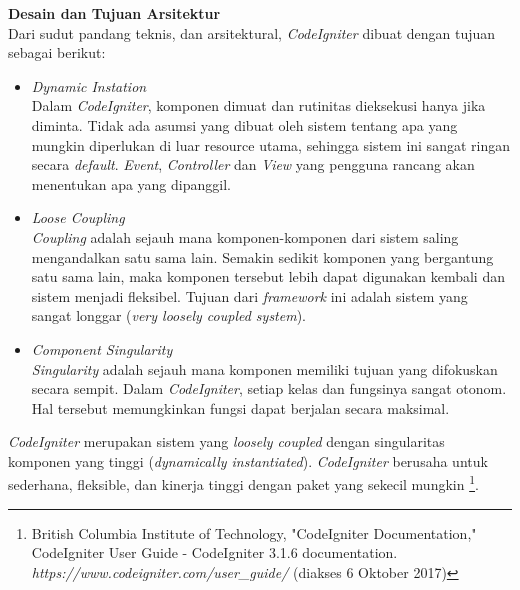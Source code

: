 \documentclass[a4paper,twoside]{article}
\begin{document}
\begin{enumerate}
\begin{enumerate}
			\textbf{Desain dan Tujuan Arsitektur} \\
			Dari sudut pandang teknis, dan arsitektural, \textit{CodeIgniter} dibuat dengan tujuan sebagai berikut:
			\begin{itemize}
				\item \textit{Dynamic Instation} \\
				Dalam \textit{CodeIgniter}, komponen dimuat dan rutinitas dieksekusi hanya jika diminta. Tidak ada asumsi yang dibuat oleh sistem tentang apa yang mungkin diperlukan di luar resource utama, sehingga sistem ini sangat ringan secara \textit{default}. \textit{Event}, \textit{Controller} dan \textit{View} yang pengguna rancang akan menentukan apa yang dipanggil.
				\item \textit{Loose Coupling} \\
				\textit{Coupling} adalah sejauh mana komponen-komponen dari sistem saling mengandalkan satu sama lain. Semakin sedikit komponen yang bergantung satu sama lain, maka komponen tersebut lebih dapat digunakan kembali dan sistem menjadi fleksibel. Tujuan dari \textit{framework} ini adalah sistem yang sangat longgar (\textit{very loosely coupled system}).
				\item \textit{Component Singularity} \\
				\textit{Singularity} adalah sejauh mana komponen memiliki tujuan yang difokuskan secara sempit. Dalam \textit{CodeIgniter}, setiap kelas dan fungsinya sangat otonom. Hal tersebut memungkinkan fungsi dapat berjalan secara maksimal.
			\end{itemize}
			
			\textit{CodeIgniter} merupakan sistem yang \textit{loosely coupled} dengan singularitas komponen yang tinggi (\textit{dynamically instantiated}). \textit{CodeIgniter} berusaha untuk sederhana, fleksible, dan kinerja tinggi dengan paket yang sekecil mungkin \footnote{British Columbia Institute of Technology, "CodeIgniter Documentation," CodeIgniter User Guide - CodeIgniter 3.1.6 documentation. \textit{https://www.codeigniter.com/user\_guide/} (diakses 6 Oktober 2017)}.\\
			

\end{enumerate}
\end{enumerate}
\end{document}
